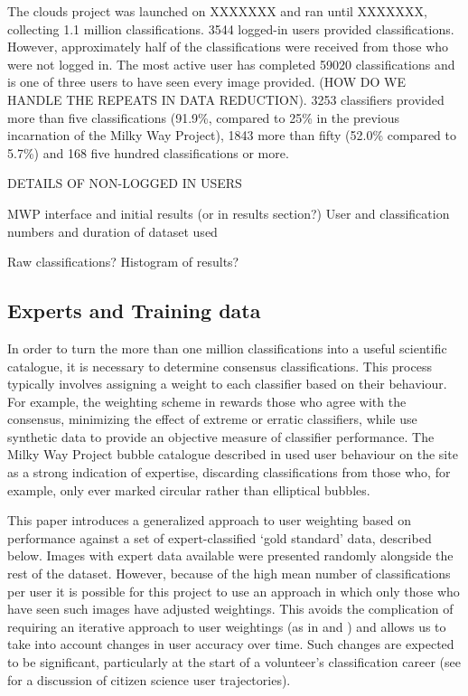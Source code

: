 \documentclass[a4,useAMS,usenatbib]{mn2e}
\begin{document}
The clouds project was launched on XXXXXXX and ran until XXXXXXX, collecting 1.1 million classifications. 3544 logged-in users provided classifications. However, approximately half of the classifications were received from those who were not logged in. The most active user has completed 59020 classifications and is one of three users to have seen every image provided. (HOW DO WE HANDLE THE REPEATS IN DATA REDUCTION). 3253 classifiers provided more than five classifications (91.9\%, compared to 25\% in the previous incarnation of the Milky Way Project), 1843 more than fifty (52.0\% compared to 5.7\%) and 168 five hundred classifications or more. 

DETAILS OF NON-LOGGED IN USERS


MWP interface and initial results (or in results section?)
User and classification numbers and duration of dataset used

Raw classifications?
Histogram of results?


\subsection{Experts and Training data}

In order to turn the more than one million classifications into a useful scientific catalogue, it is necessary to determine consensus classifications. This process typically involves assigning a weight to each classifier based on their behaviour. For example, the weighting scheme in \citet{Lintott} rewards those who agree with the consensus, minimizing the effect of extreme or erratic classifiers, while \citet{Schwamb} use synthetic data to provide an objective measure of classifier performance. The Milky Way Project bubble catalogue described in \citet{Simpson} used user behaviour on the site as a strong indication of expertise, discarding classifications from those who, for example, only ever marked circular rather than elliptical bubbles. 

This paper introduces a generalized approach to user weighting based on performance against a set of expert-classified `gold standard' data, described below. Images with expert data available were presented randomly alongside the rest of the dataset. However, because of the high mean number of classifications per user it is possible for this project to use an approach in which only those who have seen such images have adjusted weightings. This avoids the complication of requiring an iterative approach to user weightings (as in \citet{Lintott} and \citet{Schwamb}) and allows us to take into account changes in user accuracy over time. Such changes are expected to be significant, particularly at the start of a volunteer's classification career (see \citet{EdwinSimpson} for a discussion of citizen science user trajectories). 
\end{document}
